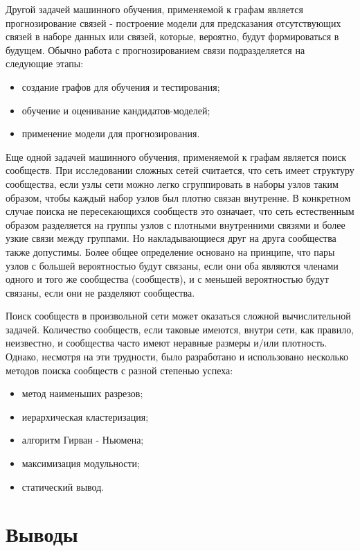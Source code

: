 Другой задачей машинного обучения, применяемой к графам является прогнозирование связей - построение модели для предсказания отсутствующих
связей в наборе данных или связей, которые, вероятно, будут формироваться в будущем. Обычно работа с прогнозированием связи подразделяется
на следующие этапы:

\begin{itemize}
    \item создание графов для обучения и тестирования;
    \item обучение и оценивание кандидатов-моделей;
    \item применение модели для прогнозирования.
\end{itemize}

Еще одной задачей машинного обучения, применяемой к графам является поиск сообществ. При исследовании сложных сетей считается, что сеть имеет
структуру сообщества, если узлы сети можно легко сгруппировать в наборы узлов таким образом, чтобы каждый набор узлов был плотно связан
внутренне. В конкретном случае поиска не пересекающихся сообществ это означает, что сеть естественным образом разделяется на группы узлов с
плотными внутренними связями и более узкие связи между группами. Но накладывающиеся друг на друга сообщества также допустимы. Более общее
определение основано на принципе, что пары узлов с большей вероятностью будут связаны, если они оба являются членами одного и того же
сообщества (сообществ), и с меньшей вероятностью будут связаны, если они не разделяют сообщества.

Поиск сообществ в произвольной сети может оказаться сложной вычислительной задачей. Количество сообществ, если таковые имеются, внутри сети,
как правило, неизвестно, и сообщества часто имеют неравные размеры и/или плотность. Однако, несмотря на эти трудности, было разработано и
использовано несколько методов поиска сообществ с разной степенью успеха:

\begin{itemize}
    \item метод наименьших разрезов;
    \item иерархическая кластеризация;
    \item алгоритм Гирван - Ньюмена;
    \item максимизация модульности;
    \item статический вывод.
\end{itemize}


\section{Выводы}

